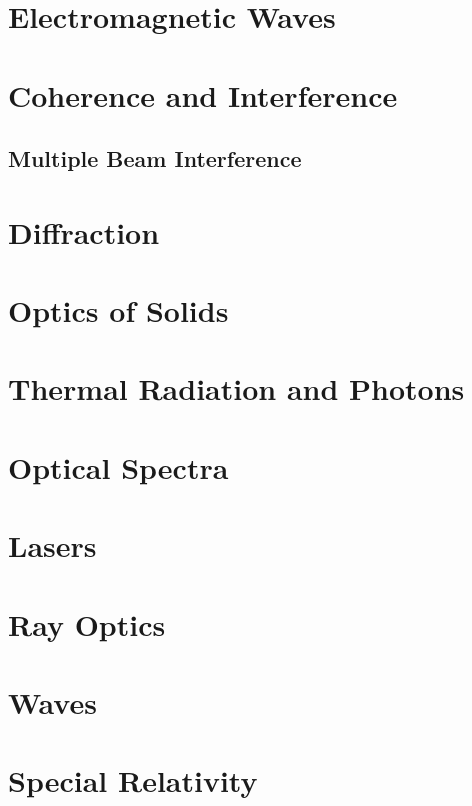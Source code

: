 \documentclass{book}
\begin{document}
\chapter{Electromagnetic Waves}

\chapter{Coherence and Interference}
\section{Multiple Beam Interference}
\chapter{Diffraction}
\chapter{Optics of Solids}
\chapter{Thermal Radiation and Photons}
\chapter{Optical Spectra}
\chapter{Lasers}
\chapter{Ray Optics}
\appendix
\begin{comment}
\chapter{Electric Circuits}
\section{Electronics}
\section{DC Current}
\section{AC Current}
\chapter{Magnetic Circuits}
\end{comment}
\chapter{Waves}

\chapter{Special Relativity}

\nocite{griffem,jackson,landau2,zangwillem,fowles}
\printbibliography
\end{document}
